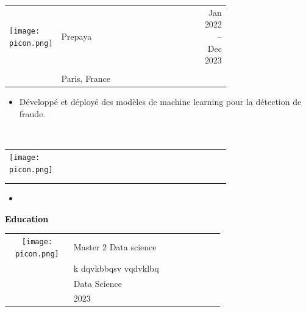 \documentclass{article}
\begin{document}
\begin{paracol}{2}
\colorbox{maincolor}{%
  \begin{minipage}{\linewidth}
    \begin{tabular}{@{}lp{0.72\linewidth}r}
      \begin{minipage}{0.05\linewidth}
        \texttt{[image: picon.png]}
      \end{minipage} & 
      {Prepaya} &  
      {\footnotesize {Jan 2022} {– Dec 2023} } \\[-10pt]
      & {\color{sidetext}{Data Scientist}} & \\
      & {\small {Paris, France} } & \\
    \end{tabular}
\begin{itemize}
    \item Développé et déployé des modèles de machine learning pour la détection de fraude.
\end{itemize}
  \end{minipage}%
}

~ \\[-6pt]

\colorbox{maincolor}{%
  \begin{minipage}{\linewidth}
    \begin{tabular}{@{}lp{0.72\linewidth}r}
      \begin{minipage}{0.05\linewidth}
        \texttt{[image: picon.png]}
      \end{minipage} & 
      {} &  
      {\footnotesize {} {} } \\[-10pt]
      & {\color{sidetext}{}} & \\
      & {\small {} } & \\
    \end{tabular}
\begin{itemize}
    \item 
\end{itemize}
  \end{minipage}%
}


\vspace{1cm}

\textcolor{black}{\Large \textbf{Education}} \\


 \begin{tabular}{@{}cp{0.7\linewidth}}
      \begin{minipage}{0.05\linewidth}
        \texttt{[image: picon.png]}
      \end{minipage} & \vspace{-12pt}
      {\color{sidetext} {Master 2 Data science}} \\[-6pt]
      & {k dqvkbbqsv  vqdvklbq} \\
      & {Data Science} \\
      & {2023} 
    \end{tabular}



\end{paracol}
\end{document}
